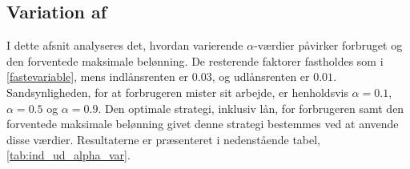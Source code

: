 



    

\subsection[Variation af  \texorpdfstring{$\alpha$}{alpha}]{Variation af \bm{$\alpha$}}
I dette afsnit analyseres det, hvordan varierende $\alpha$-værdier påvirker forbruget og den forventede maksimale belønning. De resterende faktorer fastholdes som i \eqref{fastevariable}, mens indlånsrenten er $0.03$, og udlånsrenten er $0.01$. Sandsynligheden, for at forbrugeren mister sit arbejde, er henholdsvis $\alpha=0.1$, $\alpha=0.5$ og $\alpha=0.9$. Den optimale strategi, inklusiv lån, for forbrugeren samt den forventede maksimale belønning givet denne strategi bestemmes ved at anvende disse værdier. Resultaterne er præsenteret i nedenstående tabel, \autoref{tab:ind_ud_alpha_var}.

